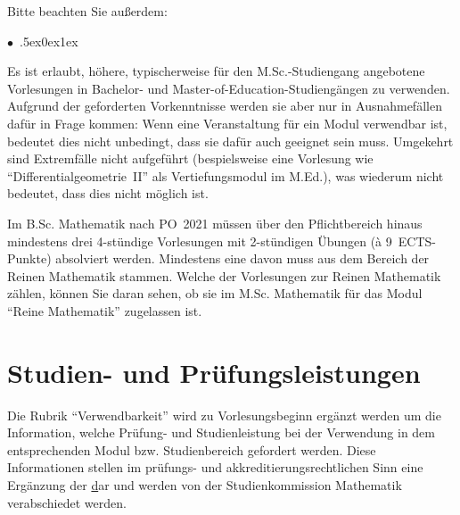 \documentclass[a4paper,10pt]{article}
\renewenvironment{itemize}{\begin{list}{$\bullet$\ }{\itemsep.5ex\setlength{\topsep}{0.5\itemsep}\parsep0ex\labelsep1ex\settowidth{\labelwidth}{$\bullet$\ }\setlength{\leftmargin}{\labelwidth}\addtolength{\leftmargin}{3ex}\addtolength{\leftmargin}{\labelsep}}}{\end{list}}
\begin{document}
\medskip
Bitte beachten Sie außerdem:
\begin{itemize}
\item
  Es ist erlaubt, höhere, typischerweise für den M.Sc.-Studiengang angebotene Vorlesungen
  in Bachelor- und Master-of-Education-Studiengängen zu verwenden.
  Aufgrund der geforderten Vorkenntnisse werden sie aber nur in Ausnahmefällen dafür in Frage kommen: 
  Wenn eine Veranstaltung für ein Modul verwendbar ist,
  bedeutet dies nicht unbedingt, dass sie dafür auch geeignet sein muss. 
  Umgekehrt sind Extremfälle nicht aufgeführt
  (bespielsweise eine Vorlesung wie "`Differentialgeometrie~II"' als Vertiefungsmodul im M.Ed.),
  was wiederum nicht bedeutet, dass dies nicht möglich ist.
\item
  Im B.Sc. Mathematik nach PO~2021 müssen über den Pflichtbereich hinaus mindestens drei
  4-stündige Vorlesungen mit 2-stündigen Übungen (\`a 9~ECTS-Punkte) absolviert werden.
  Mindestens eine davon muss aus dem Bereich der Reinen Mathematik stammen.
  Welche der Vorlesungen zur Reinen Mathematik zählen, können Sie daran sehen,
  ob sie im M.Sc. Mathematik für das Modul "`Reine Mathematik"' zugelassen ist.
\end{itemize}


\section*{Studien- und Prüfungsleistungen}


{Die Rubrik "`Verwendbarkeit"' wird zu Vorlesungsbeginn ergänzt werden um die Information,
welche Prüfung- und Studienleistung bei der Verwendung in dem entsprechenden Modul bzw. Studienbereich gefordert werden.
Diese Informationen stellen im prüfungs- und akkreditierungsrechtlichen Sinn eine Ergänzung
der \href{https://www.math.uni-freiburg.de/nlehre/de/downloads/studiendokumente} dar
und werden von der Studienkommission Mathematik verabschiedet werden.}
\end{document}
